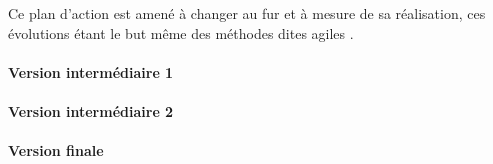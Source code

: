 	Ce plan d'action est amené à changer au fur et à mesure de sa réalisation, ces évolutions étant le but même des méthodes dites \og agiles \fg.
	
	\paragraph{Version intermédiaire 1}


	\paragraph{Version intermédiaire 2}

	\paragraph{Version finale}
